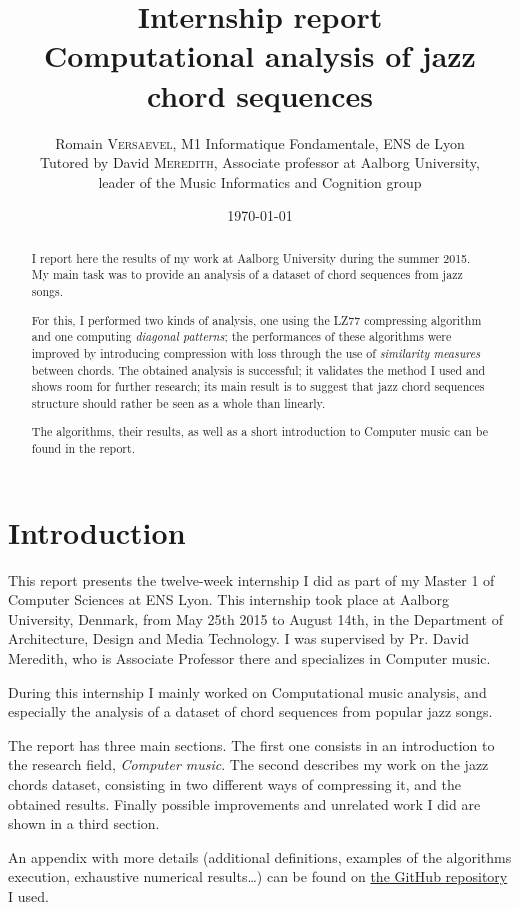 \documentclass[a4paper,10pt]{article}
\title{ \Large Internship report \\ \LARGE Computational analysis of jazz chord sequences}
\author{\normalsize Romain \textsc{Versaevel}, M1 Informatique Fondamentale, ENS de Lyon\\
\normalsize Tutored by David \textsc{Meredith}, Associate professor at Aalborg University,\\
\normalsize leader of the Music Informatics and Cognition group\\}
\date{\today}
\begin{document}
\maketitle

\begin{abstract}
\noindent
I report here the results of my work at Aalborg University during the summer 2015. My main task was to provide an analysis of a dataset of chord sequences from jazz songs.

\noindent
For this, I performed two kinds of analysis, one using the LZ77 compressing algorithm and one computing \emph{diagonal patterns}; the performances of these algorithms were improved by introducing compression with loss through the use of \emph{similarity measures} between chords. The obtained analysis is successful; it validates the method I used and shows room for further research; its main result is to suggest that jazz chord sequences structure should rather be seen as a whole than linearly.

\noindent
The algorithms, their results, as well as a short introduction to Computer music can be found in the report.
\end{abstract}

\newpage
\tableofcontents
\newpage


\section{Introduction}

This report presents the twelve-week internship I did as part of my Master 1 of Computer Sciences at ENS Lyon. This internship took place at Aalborg University, Denmark, from May 25th 2015 to August 14th, in the Department of Architecture, Design and Media Technology. I was supervised by Pr. David Meredith, who is Associate Professor there and specializes in Computer music.

During this internship I mainly worked on Computational music analysis, and especially the analysis of a dataset of chord sequences from popular jazz songs.

The report has three main sections.
The first one consists in an introduction to the research field, \emph{Computer music}.
The second describes my work on the jazz chords dataset, consisting in two different ways of compressing it, and the obtained results.
Finally possible improvements and unrelated work I did are shown in a third section.

An appendix with more details (additional definitions, examples of the algorithms execution, exhaustive numerical results\dots) can be found on \href{https://github.com/Rometach/aalborg/blob/master/Rapport/appendix.pdf}{the GitHub repository} I used.
\end{document}
